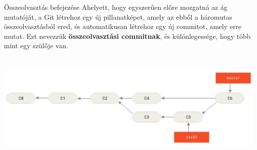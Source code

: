 \documentclass[english, aspectratio=169]{beamer}
\begin{document}
\begin{frame}{Összeolvasztás befejezése}
Ahelyett, hogy egyszerűen előre mozgatná az ág mutatóját, a Git létrehoz egy új pillanatképet, amely az ebből a háromutas összeolvasztásból ered, és automatikusan létrehoz egy új commitot, amely erre mutat. Ezt nevezzük \textbf{összeolvasztási commitnak}, és különlegessége, hogy több mint egy szülője van.
\includegraphics[height=6cm, width=14cm, keepaspectratio]{images/git_14.png}
\end{frame}
\end{document}

